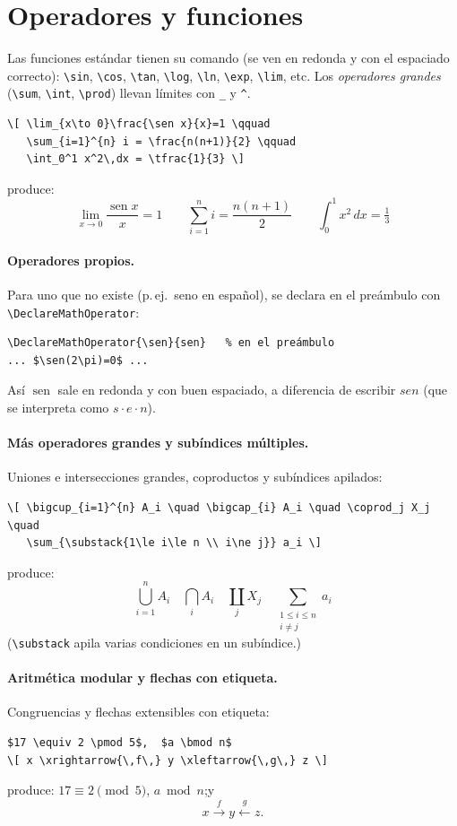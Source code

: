 \documentclass[11pt,a4paper]{article}
\newcommand{\C}[1]{\texttt{\textbackslash #1}}   %
\DeclareMathOperator{\sen}{sen}
\theoremstyle{plain}      %
\theoremstyle{definition} %
\theoremstyle{remark}
\begin{document}
\section{Operadores y funciones}
Las funciones estándar tienen su comando (se ven en redonda y con el espaciado
correcto): \C{sin}, \C{cos}, \C{tan}, \C{log}, \C{ln}, \C{exp}, \C{lim}, etc.
Los \emph{operadores grandes} (\C{sum}, \C{int}, \C{prod}) llevan límites con
\verb|_| y \verb|^|.
\begin{lstlisting}
\[ \lim_{x\to 0}\frac{\sen x}{x}=1 \qquad
   \sum_{i=1}^{n} i = \frac{n(n+1)}{2} \qquad
   \int_0^1 x^2\,dx = \tfrac{1}{3} \]
\end{lstlisting}
produce:
\[ \lim_{x\to 0}\frac{\sen x}{x}=1 \qquad
   \sum_{i=1}^{n} i = \frac{n(n+1)}{2} \qquad
   \int_0^1 x^2\,dx = \tfrac{1}{3} \]

\paragraph{Operadores propios.} Para uno que no existe (p.\,ej.\ seno en
español), se declara en el preámbulo con \C{DeclareMathOperator}:
\begin{lstlisting}
\DeclareMathOperator{\sen}{sen}   % en el preámbulo
... $\sen(2\pi)=0$ ...
\end{lstlisting}
Así $\sen$ sale en redonda y con buen espaciado, a diferencia de escribir
$sen$ (que se interpreta como $s\cdot e\cdot n$).

\paragraph{Más operadores grandes y subíndices múltiples.} Uniones e
intersecciones grandes, coproductos y subíndices apilados:
\begin{lstlisting}
\[ \bigcup_{i=1}^{n} A_i \quad \bigcap_{i} A_i \quad \coprod_j X_j \quad
   \sum_{\substack{1\le i\le n \\ i\ne j}} a_i \]
\end{lstlisting}
produce:
\[ \bigcup_{i=1}^{n} A_i \quad \bigcap_{i} A_i \quad \coprod_j X_j \quad
   \sum_{\substack{1\le i\le n \\ i\ne j}} a_i \]
(\C{substack} apila varias condiciones en un subíndice.)

\paragraph{Aritmética modular y flechas con etiqueta.} Congruencias y flechas
extensibles con etiqueta:
\begin{lstlisting}
$17 \equiv 2 \pmod 5$,  $a \bmod n$
\[ x \xrightarrow{\,f\,} y \xleftarrow{\,g\,} z \]
\end{lstlisting}
produce: $17 \equiv 2 \pmod 5$,\; $a \bmod n$;\quad y
\[ x \xrightarrow{\,f\,} y \xleftarrow{\,g\,} z. \]
\end{document}
